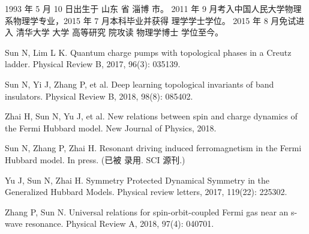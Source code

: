 \begin{resume}


    1993 年 5 月 10 日出生于 山东 省 淄博 市。
    2011 年 9 月考入中国人民大学物理系物理学专业，2015 年 7 月本科毕业并获得
    理学学士学位。
    2015 年 8 月免试进入 清华大学 大学 高等研究 院攻读 物理学博士 学位至今。


    \begin{publications}
        \item Sun N, Lim L K. Quantum charge pumps with topological phases in 
            a Creutz ladder. Physical Review B, 2017, 96(3): 035139.
        \item Sun N, Yi J, Zhang P, et al. Deep learning topological invariants 
            of band insulators. Physical Review B, 2018, 98(8): 085402.
        \item Zhai H, Sun N, Yu J, et al. New relations between spin and charge 
            dynamics of the Fermi Hubbard model. New Journal of Physics, 
            2018.
    \end{publications}

    \begin{publications}[before=\publicationskip,after=\publicationskip]
        \item Sun N, Zhang P, Zhai H. Resonant driving induced ferromagnetism 
            in the Fermi Hubbard model. In press. (已被 录用. SCI 源刊.)
    \end{publications}

    \begin{publications}
        \item Yu J, Sun N, Zhai H. Symmetry Protected Dynamical Symmetry in the 
            Generalized Hubbard Models. Physical review letters, 2017, 
            119(22): 225302.
        \item Zhang P, Sun N. Universal relations for spin-orbit-coupled Fermi 
            gas near an s-wave resonance. Physical Review A, 2018, 97(4): 
            040701.
    \end{publications}

\end{resume}
